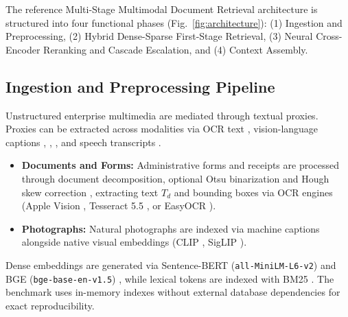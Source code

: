 The reference Multi-Stage Multimodal Document Retrieval architecture is structured into four functional phases (Fig.~\ref{fig:architecture}): (1) Ingestion and Preprocessing, (2) Hybrid Dense-Sparse First-Stage Retrieval, (3) Neural Cross-Encoder Reranking and Cascade Escalation, and (4) Context Assembly.

\subsection{Ingestion and Preprocessing Pipeline}
Unstructured enterprise multimedia are mediated through textual proxies. Proxies can be extracted across modalities via OCR text \cite{smith2007tesseract}, vision-language captions \cite{li2022blip}, \cite{li2023blip2}, \cite{xiao2024florence2}, and speech transcripts \cite{radford2023whisper}.
\begin{itemize}
    \setlength{\itemsep}{0.2pt plus 0.1pt}
    \setlength{\parskip}{0pt}
    \item \textbf{Documents and Forms:} Administrative forms and receipts are processed through document decomposition, optional Otsu binarization \cite{otsu1979} and Hough skew correction \cite{hough1962}, extracting text $T_d$ and bounding boxes via OCR engines (Apple Vision \cite{apple2020vision}, Tesseract 5.5 \cite{smith2007tesseract}, or EasyOCR \cite{jaidedai2020easyocr}).
    \item \textbf{Photographs:} Natural photographs are indexed via machine captions alongside native visual embeddings (CLIP \cite{radford2021clip}, SigLIP \cite{zhai2023siglip}).
\end{itemize}

Dense embeddings are generated via Sentence-BERT (\texttt{all-MiniLM-L6-v2}) \cite{reimers2019sbert} and BGE (\texttt{bge-base-en-v1.5}) \cite{xiao2023bge}, while lexical tokens are indexed with BM25 \cite{robertson2009bm25, robertson1995okapi}. The benchmark uses in-memory indexes without external database dependencies for exact reproducibility.

